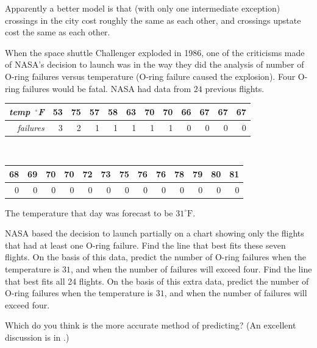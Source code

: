 \begin{exercises}
\begin{answer}
\begin{center}
      \end{center}
      Apparently a better model is that 
      (with only one intermediate exception) crossings in the city
      cost roughly the same as each other,
      and crossings upstate cost the same as each other.
    \end{answer}
  \item 
    When the space shuttle Challenger exploded in 1986, one of the
    criticisms made of NASA's decision to launch was in the way they did the
    analysis of number of O-ring failures versus temperature
    (O-ring failure caused the explosion).
    Four O-ring failures would be fatal.
    NASA had data from $24$ previous flights.
    \begin{center}
      \begin{tabular}{r|rrrrrrrrrrr}
         \textit{temp\ ${}^\circ$F} 
            &53 &75 &57 &58 &63 &70 &70 &66 &67 &67 &67 \\
         \hline
         \textit{failures}  
            &3  &2  &1  &1  &1  &1  &1  &0  &0  &0  &0
      \end{tabular}\hspace*{3em}                                           \\
      \hspace*{3em}\begin{tabular}{|rrrrrrrrrrrrr}
                68 &69 &70 &70 &72 &73 &75 &76 &76 &78 &79 &80 &81\\
         \hline
                0  &0  &0  &0  &0  &0  &0  &0  &0  &0  &0  &0  &0
      \end{tabular}
    \end{center}
    The temperature that day was forecast to be \( 31^\circ\text{F} \).
    \begin{exparts}
      \partsitem NASA based the decision to launch partially on a chart showing
        only the flights that had at least one O-ring failure.
        Find the line that best fits these seven flights.
        On the basis of this data,
        predict the number of O-ring failures when the temperature is $31$, and
        when the number of failures will exceed four.
      \partsitem Find the line that best fits all 24 flights.
        On the basis of this extra data,
        predict the number of O-ring failures when the temperature is $31$, and
        when the number of failures will exceed four.
    \end{exparts}
    Which do you think is the more accurate method of predicting?
    (An excellent discussion is in \cite{Stats}.)

\end{exercises}
